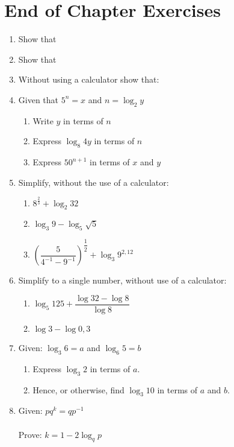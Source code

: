 \section{End of Chapter Exercises}
\begin{enumerate}
\item{Show that
}
\item{Show that
}
\item{Without using a calculator show that:
}
\item{Given that $5^n=x$ and $n=\log_2y$
\begin{enumerate}
\item Write $y$ in terms of $n$
\item Express $\log_8 4y$ in terms of $n$
\item Express $50^{n+1}$ in terms of $x$ and $y$
\end{enumerate}}

\item{Simplify, without the use of a calculator:
\begin{enumerate}
\item{$8^{\frac{2}{3}}+\log_2 32$}
\item{$\log_3 9 - \log_5 \sqrt{5}$}
\item{$\left(\dfrac{5}{4^{-1}-9^{-1}}\right)^{\dfrac{1}{2}}+\log_3 9^{2,12}$}
\end{enumerate}}
\item{Simplify to a single number, without use of a calculator:
\begin{enumerate}
\item{$\log_5 125 + \dfrac{\log 32-\log 8}{\log 8}$}
\item{$\log 3 - \log 0,3$}
\end{enumerate}}
\item{Given: \quad $\log_3 6 = a$ and $\log_6 5 = b$
\begin{enumerate}
\item{Express $\log_3 2$ in terms of $a$.}
\item{Hence, or otherwise, find $\log_3 10$ in terms of $a$ and $b$.}
\end{enumerate}}

\item{Given: \quad $pq^k = qp^{-1}$ \\ \\ Prove: \quad $k = 1 - 2\log_q p$}


\end{enumerate}
